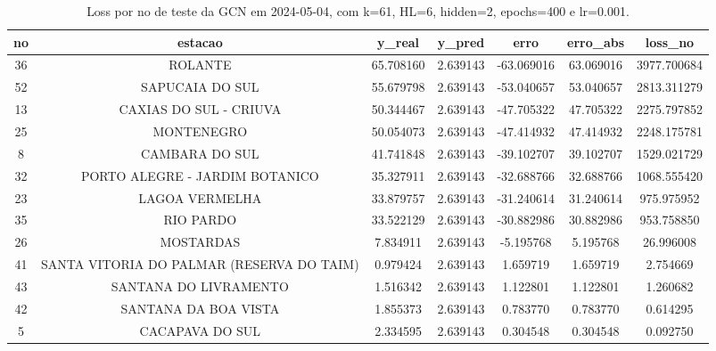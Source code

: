 \begin{table}[h]
\centering
\caption{Loss por no de teste da GCN em 2024-05-04, com k=61, HL=6, hidden=2, epochs=400 e lr=0.001.}
\label{tab:gcn_loss_k61_hl6_h2_e400_d20240504}
\begin{tabular}{ccccccc}
\toprule
no & estacao & y\_real & y\_pred & erro & erro\_abs & loss\_no \\
\midrule
36 & ROLANTE & 65.708160 & 2.639143 & -63.069016 & 63.069016 & 3977.700684 \\
52 & SAPUCAIA DO SUL & 55.679798 & 2.639143 & -53.040657 & 53.040657 & 2813.311279 \\
13 & CAXIAS DO SUL - CRIUVA & 50.344467 & 2.639143 & -47.705322 & 47.705322 & 2275.797852 \\
25 & MONTENEGRO & 50.054073 & 2.639143 & -47.414932 & 47.414932 & 2248.175781 \\
8 & CAMBARA DO SUL & 41.741848 & 2.639143 & -39.102707 & 39.102707 & 1529.021729 \\
32 & PORTO ALEGRE - JARDIM BOTANICO & 35.327911 & 2.639143 & -32.688766 & 32.688766 & 1068.555420 \\
23 & LAGOA VERMELHA & 33.879757 & 2.639143 & -31.240614 & 31.240614 & 975.975952 \\
35 & RIO PARDO & 33.522129 & 2.639143 & -30.882986 & 30.882986 & 953.758850 \\
26 & MOSTARDAS & 7.834911 & 2.639143 & -5.195768 & 5.195768 & 26.996008 \\
41 & SANTA VITORIA DO PALMAR (RESERVA DO TAIM) & 0.979424 & 2.639143 & 1.659719 & 1.659719 & 2.754669 \\
43 & SANTANA DO LIVRAMENTO & 1.516342 & 2.639143 & 1.122801 & 1.122801 & 1.260682 \\
42 & SANTANA DA BOA VISTA & 1.855373 & 2.639143 & 0.783770 & 0.783770 & 0.614295 \\
5 & CACAPAVA DO SUL & 2.334595 & 2.639143 & 0.304548 & 0.304548 & 0.092750 \\
\bottomrule
\end{tabular}
\end{table}
